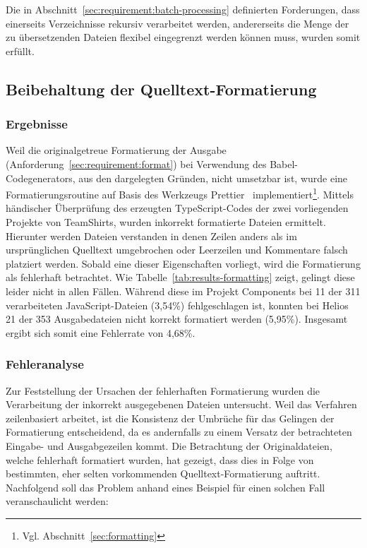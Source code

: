 Die in Abschnitt~\ref{sec:requirement:batch-processing} definierten Forderungen, dass einerseits Verzeichnisse rekursiv verarbeitet werden, andererseits die Menge der zu übersetzenden Dateien flexibel eingegrenzt werden können muss, wurden somit erfüllt.

\subsection{Beibehaltung der Quelltext-Formatierung}

\subsubsection{Ergebnisse}

Weil die originalgetreue Formatierung der Ausgabe (Anforderung~\ref{sec:requirement:format}) bei Verwendung des Babel-Codegenerators, aus den dargelegten Gründen, nicht umsetzbar ist, wurde eine Formatierungsroutine auf Basis des Werkzeugs Prettier~\autocite{SOFTWARE:PRETTIER} implementiert\footnote{Vgl. Abschnitt~\ref{sec:formatting}}.
Mittels händischer Überprüfung des erzeugten TypeScript-Codes der zwei vorliegenden Projekte von TeamShirts, wurden inkorrekt formatierte Dateien ermittelt. Hierunter werden Dateien verstanden in denen Zeilen anders als im ursprünglichen Quelltext umgebrochen oder Leerzeilen und Kommentare falsch platziert werden. Sobald eine dieser Eigenschaften vorliegt, wird die Formatierung als fehlerhaft betrachtet. Wie Tabelle~\ref{tab:results-formatting} zeigt, gelingt diese leider nicht in allen Fällen. Während diese im Projekt Components bei 11 der 311 verarbeiteten JavaScript-Dateien (3,54\%) fehlgeschlagen ist, konnten bei Helios 21 der 353 Ausgabedateien nicht korrekt formatiert werden (5,95\%). Insgesamt ergibt sich somit eine Fehlerrate von 4,68\%.

\medbreak


\subsubsection{Fehleranalyse}

Zur Feststellung der Ursachen der fehlerhaften Formatierung wurden die Verarbeitung der inkorrekt ausgegebenen Dateien untersucht. Weil das Verfahren zeilenbasiert arbeitet, ist die Konsistenz der Umbrüche für das Gelingen der Formatierung entscheidend, da es andernfalls zu einem Versatz der betrachteten Eingabe- und Ausgabgezeilen kommt. Die Betrachtung der Originaldateien, welche fehlerhaft formatiert wurden, hat gezeigt, dass dies in Folge von bestimmten, eher selten vorkommenden Quelltext-Formatierung auftritt. Nachfolgend soll das Problem anhand eines Beispiel für einen solchen Fall veranschaulicht werden:

